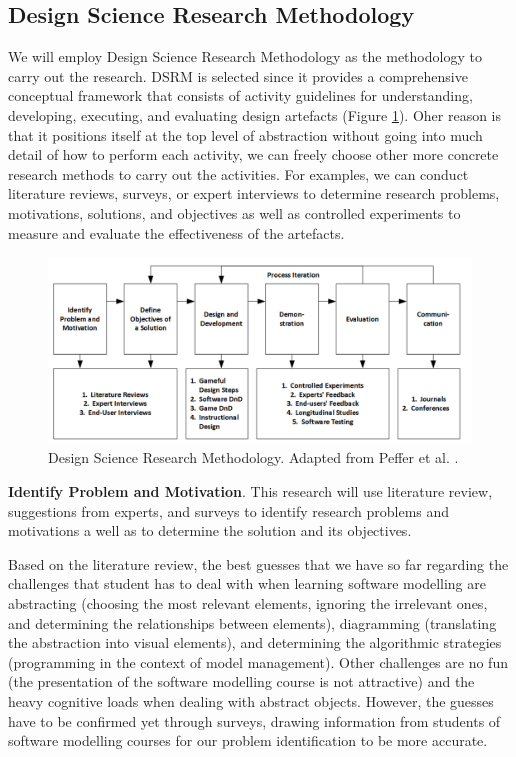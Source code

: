 \documentclass[12pt, a4paper]{report}
\begin{document}
\subsection{Design Science Research Methodology}
We will employ Design Science Research Methodology \cite{peffers2007design} as the methodology to carry out the research. DSRM is selected since it provides a comprehensive conceptual framework that consists of activity guidelines for understanding, developing, executing, and evaluating design artefacts (Figure \ref{dsrm}). Oher reason is that it positions itself at the top level of abstraction without going into much detail of how to perform each activity, we can freely choose other more concrete research methods to carry out the activities. For examples, we can conduct literature reviews, surveys, or expert interviews to determine research problems, motivations, solutions, and objectives as well as controlled experiments to measure and evaluate the effectiveness of the artefacts. 

\begin{figure}[ht]
\centering
\includegraphics[width=\textwidth]{dsrm}
\caption{Design Science Research Methodology. Adapted from Peffer et al. \cite{peffers2007design}.}
\label{dsrm}
\end{figure}

\textbf{Identify Problem and Motivation}. This research will use literature review, suggestions from experts, and surveys to identify research problems and motivations a well as to determine the solution and its objectives.

Based on the literature review, the best guesses that we have so far regarding the challenges that student has to deal with when learning software modelling are abstracting (choosing the most relevant elements, ignoring the irrelevant ones, and determining the relationships between elements), diagramming (translating the abstraction into visual elements), and determining the algorithmic strategies (programming in the context of model management). Other challenges are no fun (the presentation of the software modelling course is not attractive) and the heavy cognitive loads when dealing with abstract objects. However, the guesses have to be confirmed yet through surveys, drawing information from students of software modelling courses for our problem identification to be more accurate.
\end{document}
